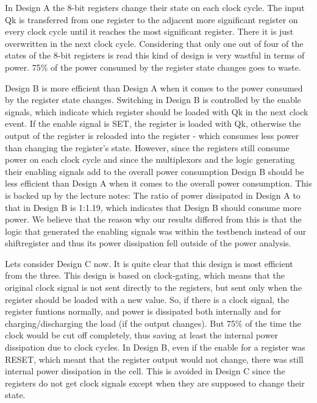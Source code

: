 \documentclass[11pt,a4paper]{article}
\begin{document}
In Design A the 8-bit registers change their state on each clock cycle. The input Qk is transferred from one register to the adjacent more significant register on every clock cycle until it reaches the most significant register. There it is just overwritten in the next clock cycle. Considering that only one out of four of the states of the 8-bit registers is read this kind of design is very wastful in terms of power. 75\% of the power consumed by the register state changes goes to waste. 

Design B is more efficient than Design A when it comes to the power consumed by the register state changes. Switching in Design B is controlled by the enable signals, which indicate which register should be loaded with Qk in the next clock event. If the enable signal is SET, the register is loaded with Qk, otherwise the output of the register is reloaded into the register - which consumes less power than changing the register's state. However, since the registers still consume power on each clock cycle and since the multiplexors and the logic generating their enabling signals add to the overall power consumption Design B should be less efficient than Design A when it comes to the overall power consumption. This is backed up by the lecture notes: The ratio of power dissipated in Design A to that in Design B is 1:1.19, which indicates that Design B should consume more power. We believe that the reason why our results differed from this is that the logic that generated the enabling signals was within the testbench instead of our shiftregister and thus its power dissipation fell outside of the power analysis.

Lets consider Design C now. It is quite clear that this design is most efficient from the three. This design is based on clock-gating, which means that the original clock signal is not sent directly to the registers, but sent only when the register should be loaded with a new value. So, if there is a clock signal, the register funtions normally, and power is dissipated both internally and for charging/discharging the load (if the output changes). But 75\% of the time the clock would be cut off completely, thus saving at least the internal power dissipation due to clock cycles. In Design B, even if the enable for a register was RESET, which meant that the register output would not change, there was still internal power dissipation in the cell. This is avoided in Design C since the registers do not get clock signals except when they are supposed to change their state.
\end{document}
